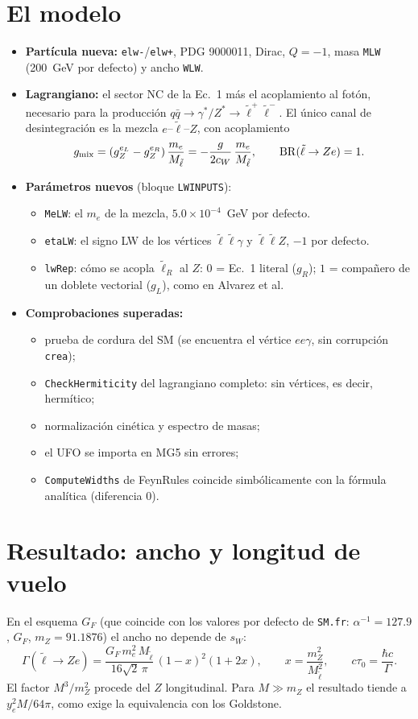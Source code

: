 \documentclass[11pt,a4paper]{article}
\newcommand{\lt}{\tilde{\ell}}
\begin{document}
\section{El modelo}
\begin{itemize}
\item \textbf{Partícula nueva:} \texttt{elw-}/\texttt{elw+}, PDG 9000011, Dirac, $Q=-1$, masa \texttt{MLW} (200~GeV por defecto) y ancho \texttt{WLW}.
\item \textbf{Lagrangiano:} el sector NC de la Ec.~1 más el acoplamiento al fotón, necesario para la producción $q\bar q\to\gamma^*/Z^*\to\lt^+\lt^-$. El único canal de desintegración es la mezcla $e$--$\lt$--$Z$, con acoplamiento
\[
g_{\rm mix}=(g_Z^{e_L}-g_Z^{e_R})\,\frac{m_e}{M_{\lt}}=-\frac{g}{2c_W}\,\frac{m_e}{M_{\lt}},\qquad \mathrm{BR}(\lt\to Ze)=1 .
\]
\item \textbf{Parámetros nuevos} (bloque \texttt{LWINPUTS}):
  \begin{itemize}
  \item \texttt{MeLW}: el $m_e$ de la mezcla, $5.0\times10^{-4}$~GeV por defecto.
  \item \texttt{etaLW}: el signo LW de los vértices $\lt\lt\gamma$ y $\lt\lt Z$, $-1$ por defecto.
  \item \texttt{lwRep}: cómo se acopla $\lt_R$ al $Z$: $0$ = Ec.~1 literal ($g_R$); $1$ = compañero de un doblete vectorial ($g_L$), como en Alvarez et al.
  \end{itemize}
\item \textbf{Comprobaciones superadas:}
  \begin{itemize}
  \item prueba de cordura del SM (se encuentra el vértice $ee\gamma$, sin corrupción \texttt{crea});
  \item \texttt{CheckHermiticity} del lagrangiano completo: sin vértices, es decir, hermítico;
  \item normalización cinética y espectro de masas;
  \item el UFO se importa en MG5 sin errores;
  \item \texttt{ComputeWidths} de FeynRules coincide simbólicamente con la fórmula analítica (diferencia 0).
  \end{itemize}
\end{itemize}

\section{Resultado: ancho y longitud de vuelo}
En el esquema $G_F$ (que coincide con los valores por defecto de \texttt{SM.fr}: $\alpha^{-1}=127.9$, $G_F$, $m_Z=91.1876$) el ancho no depende de $s_W$:
\begin{equation}
\Gamma(\lt\to Ze)=\frac{G_F\,m_e^2\,M_{\lt}}{16\sqrt2\,\pi}\,(1-x)^2(1+2x),\qquad x=\frac{m_Z^2}{M_{\lt}^2},\qquad c\tau_0=\frac{\hbar c}{\Gamma}.
\end{equation}
El factor $M^3/m_Z^2$ procede del $Z$ longitudinal. Para $M\gg m_Z$ el resultado tiende a $y_e^2M/64\pi$, como exige la equivalencia con los Goldstone.
\end{document}
